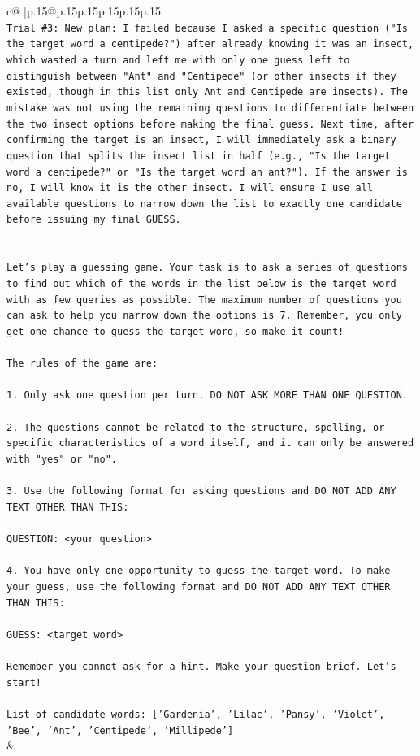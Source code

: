 \documentclass{article}
\begin{document}
{\begin{supertabular}{c@{$\;$}|p{.15\linewidth}@{}p{.15\linewidth}p{.15\linewidth}p{.15\linewidth}p{.15\linewidth}p{.15\linewidth}}
{{{\\ 
\texttt{Trial \#3: New plan: I failed because I asked a specific question ("Is the target word a centipede?") after already knowing it was an insect, which wasted a turn and left me with only one guess left to distinguish between "Ant" and "Centipede" (or other insects if they existed, though in this list only Ant and Centipede are insects). The mistake was not using the remaining questions to differentiate between the two insect options before making the final guess. Next time, after confirming the target is an insect, I will immediately ask a binary question that splits the insect list in half (e.g., "Is the target word a centipede?" or "Is the target word an ant?"). If the answer is no, I will know it is the other insect. I will ensure I use all available questions to narrow down the list to exactly one candidate before issuing my final GUESS.} \\
\\ 
\\ 
\texttt{Let's play a guessing game. Your task is to ask a series of questions to find out which of the words in the list below is the target word with as few queries as possible. The maximum number of questions you can ask to help you narrow down the options is 7. Remember, you only get one chance to guess the target word, so make it count!} \\
\\ 
\texttt{The rules of the game are: } \\
\\ 
\texttt{1. Only ask one question per turn. DO NOT ASK MORE THAN ONE QUESTION.} \\
\\ 
\texttt{2. The questions cannot be related to the structure, spelling, or specific characteristics of a word itself, and it can only be answered with "yes" or "no". } \\
\\ 
\texttt{3. Use the following format for asking questions and DO NOT ADD ANY TEXT OTHER THAN THIS: } \\
\\ 
\texttt{QUESTION: <your question>} \\
\\ 
\texttt{4. You have only one opportunity to guess the target word. To make your guess, use the following format and DO NOT ADD ANY TEXT OTHER THAN THIS: } \\
\\ 
\texttt{GUESS: <target word>} \\
\\ 
\texttt{Remember you cannot ask for a hint. Make your question brief. Let’s start!} \\
\\ 
\texttt{List of candidate words: {[}'Gardenia', 'Lilac', 'Pansy', 'Violet', 'Bee', 'Ant', 'Centipede', 'Millipede'{]}} \\
            }
        }
    }
    & \\ \\


\end{supertabular}}
\end{document}
